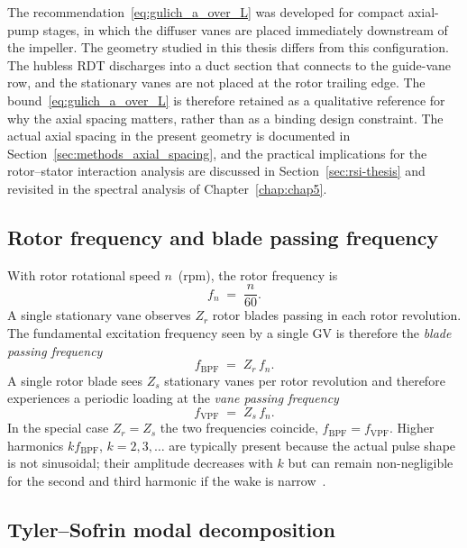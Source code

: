 The recommendation~\eqref{eq:gulich_a_over_L} was developed for compact axial-pump stages, in which the diffuser vanes are placed immediately downstream of the impeller. The geometry studied in this thesis differs from this configuration. The hubless RDT discharges into a duct section that connects to the guide-vane row, and the stationary vanes are not placed at the rotor trailing edge. The bound~\eqref{eq:gulich_a_over_L} is therefore retained as a qualitative reference for why the axial spacing matters, rather than as a binding design constraint. The actual axial spacing in the present geometry is documented in Section~\ref{sec:methods_axial_spacing}, and the practical implications for the rotor--stator interaction analysis are discussed in Section~\ref{sec:rsi-thesis} and revisited in the spectral analysis of Chapter~\ref{chap:chap5}.

\subsection{Rotor frequency and blade passing frequency}
\label{sec:rsi-bpf}
 
With rotor rotational speed $n$~(rpm), the rotor frequency is
\begin{equation}
    f_n \;=\; \frac{n}{60}. \label{eq:fn}
\end{equation}
A single stationary vane observes $Z_r$ rotor blades passing in each rotor revolution. The fundamental excitation frequency seen by a single GV is therefore the \emph{blade passing frequency}~\cite{Brekke2015}
\begin{equation}
    f_{\mathrm{BPF}} \;=\; Z_r\, f_n. \label{eq:fbpf}
\end{equation}
A single rotor blade sees $Z_s$ stationary vanes per rotor revolution and therefore experiences a periodic loading at the \emph{vane passing frequency}
\begin{equation}
    f_{\mathrm{VPF}} \;=\; Z_s\, f_n. \label{eq:fvpf}
\end{equation}
In the special case $Z_r = Z_s$ the two frequencies coincide, $f_{\mathrm{BPF}} = f_{\mathrm{VPF}}$. Higher harmonics $k f_{\mathrm{BPF}}$, $k=2,3,\dots$ are typically present because the actual pulse shape is not sinusoidal; their amplitude decreases with $k$ but can remain non-negligible for the second and third harmonic if the wake is narrow~\cite{Egusquiza2006,Rodriguez2007}.
 
\subsection{Tyler--Sofrin modal decomposition}
\label{sec:rsi-tyler}
 
